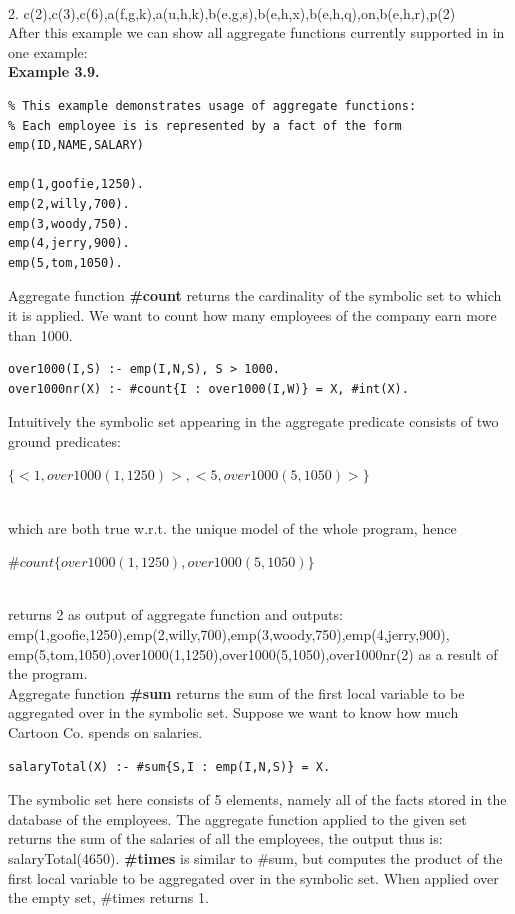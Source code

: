 \documentclass[14pt,a4paper, titlepage]{article}
\begin{document}
\\ 2. {c(2),c(3),c(6),a(f,g,k),a(u,h,k),b(e,g,s),b(e,h,x),b(e,h,q),on,b(e,h,r),p(2)}
\\After this example we can show all aggregate functions currently supported in \dlvhex{} in one example:
\\ \textbf{Example 3.9.}
\begin{lstlisting}
% This example demonstrates usage of aggregate functions:
% Each employee is is represented by a fact of the form emp(ID,NAME,SALARY)

emp(1,goofie,1250).
emp(2,willy,700).
emp(3,woody,750).
emp(4,jerry,900).
emp(5,tom,1050).
\end{lstlisting}
Aggregate function \textbf{\#count} returns the cardinality of the symbolic set to which it is applied. We want to count how many employees of the company earn more than 1000. 
\begin{lstlisting}
over1000(I,S) :- emp(I,N,S), S > 1000.
over1000nr(X) :- #count{I : over1000(I,W)} = X, #int(X).
\end{lstlisting}
Intuitively the symbolic set appearing in the aggregate predicate consists of two ground predicates: \\ \centerline{$\{<1,over1000(1,1250)>,<5,over1000(5,1050)>\}$}
\\which are both true w.r.t. the unique model of the whole program, hence \\ \centerline{$ \#count\{over1000(1,1250),over1000(5,1050)\}$} \\returns 2 as output of aggregate function and outputs:\\ {emp(1,goofie,1250),emp(2,willy,700),emp(3,woody,750),emp(4,jerry,900),\\emp(5,tom,1050),over1000(1,1250),over1000(5,1050),over1000nr(2)}
as a result of the program.
\bigskip \\Aggregate function \textbf{\#sum} returns the sum of the first local variable to be aggregated over in the symbolic set. Suppose we want to know how much Cartoon Co. spends on salaries.
\begin{lstlisting}
salaryTotal(X) :- #sum{S,I : emp(I,N,S)} = X.
\end{lstlisting}
The symbolic set here consists of 5 elements, namely all of the facts stored in the database of the employees. The aggregate function applied to the given set returns the sum of the salaries of all the employees, the output thus is:
{salaryTotal(4650)}. \textbf{\#times} is similar to \#sum, but computes the product of the first local variable to be aggregated over in the symbolic set. When applied over the empty set, \#times returns 1.
\end{document}
